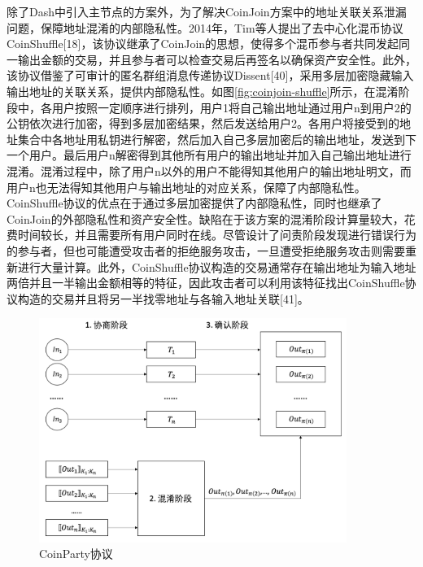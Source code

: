 除了Dash中引入主节点的方案外，为了解决CoinJoin方案中的地址关联关系泄漏问题，保障地址混淆的内部隐私性。2014年，Tim等人提出了去中心化混币协议CoinShuffle[18]，该协议继承了CoinJoin的思想，使得多个混币参与者共同发起同一输出金额的交易，并且参与者可以检查交易后再签名以确保资产安全性。此外，该协议借鉴了可审计的匿名群组消息传递协议Dissent[40]，采用多层加密隐藏输入输出地址的关联关系，提供内部隐私性。如图\ref{fig:coinjoin-shuffle}所示，在混淆阶段中，各用户按照一定顺序进行排列，用户1将自己输出地址通过用户n到用户2的公钥依次进行加密，得到多层加密结果，然后发送给用户2。各用户将接受到的地址集合中各地址用私钥进行解密，然后加入自己多层加密后的输出地址，发送到下一个用户。最后用户n解密得到其他所有用户的输出地址并加入自己输出地址进行混淆。混淆过程中，除了用户n以外的用户不能得知其他用户的输出地址明文，而用户n也无法得知其他用户与输出地址的对应关系，保障了内部隐私性。CoinShuffle协议的优点在于通过多层加密提供了内部隐私性，同时也继承了CoinJoin的外部隐私性和资产安全性。缺陷在于该方案的混淆阶段计算量较大，花费时间较长，并且需要所有用户同时在线。尽管设计了问责阶段发现进行错误行为的参与者，但也可能遭受攻击者的拒绝服务攻击，一旦遭受拒绝服务攻击则需要重新进行大量计算。此外，CoinShuffle协议构造的交易通常存在输出地址为输入地址两倍并且一半输出金额相等的特征，因此攻击者可以利用该特征找出CoinShuffle协议构造的交易并且将另一半找零地址与各输入地址关联[41]。

\begin{figure}
\centering
\includegraphics[width=10cm]{figures/coinparty.png}
\caption{CoinParty协议}
\label{fig:coinparty}
\end{figure}

